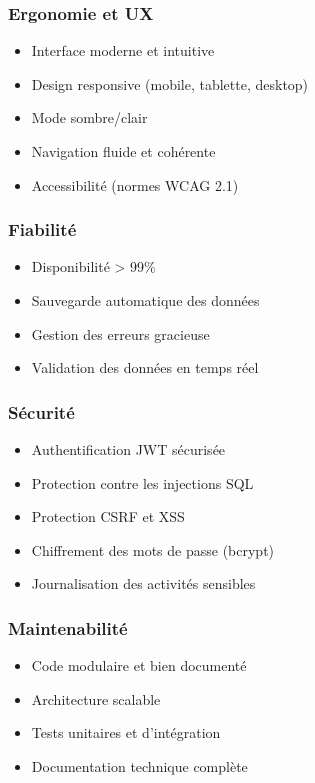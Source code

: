 \documentclass[12pt,a4paper]{report}
\begin{document}
\subsubsection{Ergonomie et UX}

\begin{itemize}
    \item Interface moderne et intuitive
    \item Design responsive (mobile, tablette, desktop)
    \item Mode sombre/clair
    \item Navigation fluide et cohérente
    \item Accessibilité (normes WCAG 2.1)
\end{itemize}

\subsubsection{Fiabilité}

\begin{itemize}
    \item Disponibilité > 99\%
    \item Sauvegarde automatique des données
    \item Gestion des erreurs gracieuse
    \item Validation des données en temps réel
\end{itemize}

\subsubsection{Sécurité}

\begin{itemize}
    \item Authentification JWT sécurisée
    \item Protection contre les injections SQL
    \item Protection CSRF et XSS
    \item Chiffrement des mots de passe (bcrypt)
    \item Journalisation des activités sensibles
\end{itemize}

\subsubsection{Maintenabilité}

\begin{itemize}
    \item Code modulaire et bien documenté
    \item Architecture scalable
    \item Tests unitaires et d'intégration
    \item Documentation technique complète
\end{itemize}
\end{document}
